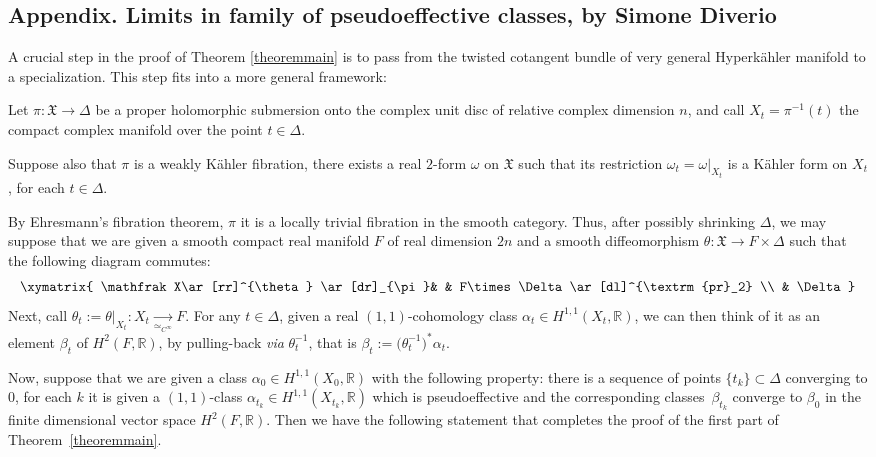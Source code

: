\documentclass[JEP,XML,SOM,Unicode,NoEqCountersInSection,published]{cedram}
\theoremstyle{plain}
\theoremstyle{definition}
\begin{document}
\begin{appendix}
\renewcommand{\thefootnote}{*}
\section*{Appendix. Limits in family of pseudoeffective classes, by Simone Diverio\texorpdfstring{\protect\footnotemark}{fn}}
\label{appendixdiverio}

A crucial step in the proof of Theorem \ref{theoremmain} is to pass from the twisted cotangent bundle of very general Hyperkähler manifold to a specialization. This step fits into a more general framework:

Let $\pi\colon\mathfrak X\to\Delta$ be a proper holomorphic submersion onto the complex unit disc of relative complex dimension $n$, and call $X_t=\pi^{-1}(t)$ the compact complex manifold over the point $t\in\Delta$.

Suppose also that $\pi$ is a weakly Kähler fibration, \ie there exists a real $2$-form $\omega$ on $\mathfrak X$ such that its restriction $\omega_t=\omega|_{X_t}$ is a Kähler form on $X_t$, for each $t\in\Delta$.

By Ehresmann's fibration theorem, $\pi$ it is a locally trivial fibration in the smooth category. Thus, after possibly shrinking $\Delta$, we may suppose that we are given a smooth compact real manifold $F$ of real dimension $2n$ and a smooth diffeomorphism $\theta\colon\mathfrak X\to F\times\Delta$ such that the following diagram commutes:
\[
\xymatrix{
\mathfrak X\ar[rr]^{\theta} \ar[dr]_{\pi}& & F\times\Delta \ar[dl]^{\textrm{pr}_2} \\
& \Delta
}
\]
Next, call $\theta_t:=\theta|_{X_t}\colon X_t\underset{\simeq_{C^\infty}}\to F$. For any $t\in\Delta$, given a real $(1,1)$-cohomology class $\alpha_t\in H^{1,1}(X_t,\mathbb R)$, we can then think of it as an element $\beta_t$ of $H^2(F,\mathbb R)$, by pulling-back \textsl{via} $\theta_t^{-1}$, that is $\beta_t:=\bigl(\theta_t^{-1}\bigr)^*\alpha_t$.

Now, suppose that we are given a class $\alpha_0\in H^{1,1}(X_0,\mathbb R)$ with the following property: there is a sequence of points $\{t_k\}\subset\Delta$ converging to $0$, for each $k$ it is given a $(1,1)$-class $\alpha_{t_k}\in H^{1,1}(X_{t_k},\mathbb R)$ which is pseudoeffective and the corresponding classes~$\beta_{t_k}$ converge to $\beta_0$ in the finite dimensional vector space $H^2(F,\mathbb R)$. Then we have the following statement that completes the proof of the first part of Theorem~\ref{theoremmain}.


\end{appendix}
\end{document}
